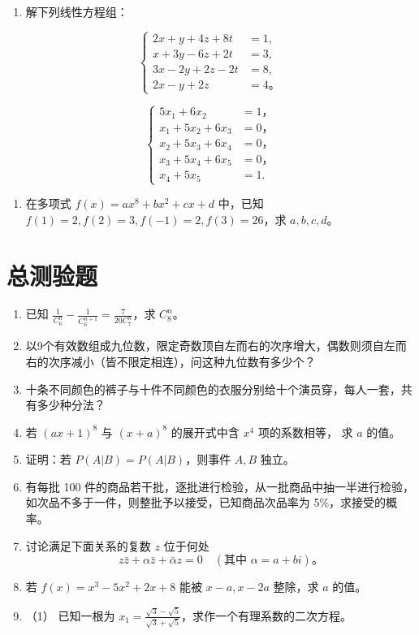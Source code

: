 \begin{enumerate}[start=29]
\item
  解下列线性方程组：
\end{enumerate}

\[
\left\{
\begin{aligned}
2x+y+4z+8t&=1,\\
x+3y-6z+2t&=3,\\
3x-2y+2z-2t&=8,\\
2x-y+2z&=4\text{。}
\end{aligned}
\right.\tag{1}
\]

\[
\left\{ \begin{array}{ll} 5x_1+6x_2 & = 1\text{，} \\ x _ {1} + 5 x _ {2} + 6 x _ {3} & = 0\text{，} \\ x _ {2} + 5 x _ {3} + 6 x _ {4} & = 0\text{，} \\ x _ {3} + 5 x _ {4} + 6 x _ {5} & = 0\text{，} \\ x _ {4} + 5 x _ {5} & = 1. \end{array} \right.
\]

\begin{enumerate}[start=30]
\item
  在多项式 \(f(x) = ax^8 + bx^2 + cx + d\) 中，已知
  \(f(1) = 2, f(2) = 3, f(-1) = 2, f(3) = 26\)，求 \(a, b, c, d\)。
\end{enumerate}

\section{总测验题}

\begin{enumerate}
\item
  已知 \(\frac{1}{C_6^n}-\frac{1}{C_6^{n+1}}=\frac{7}{20C_7^n}\)，求
  \(C_8^n\)。
\item
  以9个有效数组成九位数，限定奇数顶自左而右的次序增大，偶数则须自左而右的次序减小（皆不限定相连），问这种九位数有多少个？
\item
  十条不同颜色的裤子与十件不同颜色的衣服分别给十个演员穿，每人一套，共有多少种分法？
\item
  若 \((ax + 1)^8\) 与 \((x + a)^8\) 的展开式中含 \(x^4\) 项的系数相等，
  求 \(a\) 的值。
\item
  证明：若 \(P(A|B) = P(A|B)\)，则事件 \(A, B\) 独立。
\item
  有每批 100
  件的商品若干批，逐批进行检验，从一批商品中抽一半进行检验，如次品不多于一件，则整批予以接受，已知商品次品率为
  5\%，求接受的概率。
\item
  讨论满足下面关系的复数 \(z\) 位于何处
\[
z\bar z+\alpha\bar z+\bar\alpha z=0\quad(\text{其中 }\alpha=a+bi)\text{。}
\]
\item
  若 \(f(x) = x^3 - 5x^2 + 2x + 8\) 能被 \(x - a, x - 2a\) 整除，求
  \(a\) 的值。
\item
  （1） 已知一根为
  \(x_{1} = \frac{\sqrt{3} - \sqrt{5}}{\sqrt{3} + \sqrt{5}}\)，求作一个有理系数的二次方程。
\end{enumerate}

